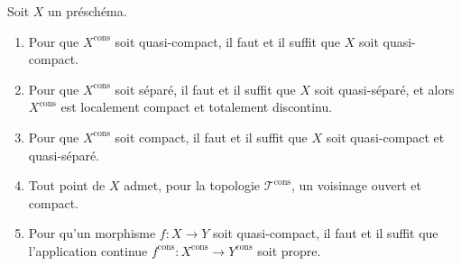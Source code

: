 \begin{proposition}[1.9.15]
\label{IV.1.9.15-fr}
Soit $X$ un préschéma.
\begin{enumerate}
  \item[\textup{(i)}] Pour que $X^{\mathrm{cons}}$ soit quasi-compact, il faut et il
  suffit que $X$ soit quasi-compact.
  \item[\textup{(ii)}] Pour que $X^{\mathrm{cons}}$ soit séparé, il faut et il suffit
  que $X$ soit quasi-séparé, et alors $X^{\mathrm{cons}}$ est localement
  compact et totalement discontinu.
  \item[\textup{(iii)}] Pour que $X^{\mathrm{cons}}$ soit compact, il faut et il suffit
  que $X$ soit quasi-compact et quasi-séparé.
  \item[\textup{(iv)}] Tout point de $X$ admet, pour la topologie
  $\mathscr T^{\mathrm{cons}}$, un voisinage ouvert et compact.
  \item[\textup{(v)}] Pour qu'un morphisme $f:X\to Y$ soit quasi-compact, il faut et il
  suffit que l'application continue
  $f^{\mathrm{cons}}:X^{\mathrm{cons}}\to Y^{\mathrm{cons}}$ soit propre.
\end{enumerate}
\end{proposition}

